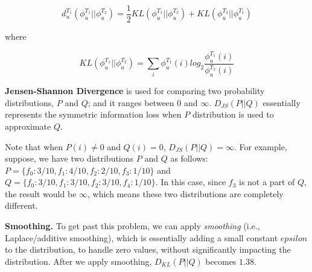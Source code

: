 \begin{equation}
d^{T_1}_u (\phi^{T_1}_u || \phi^{T_2}_u) = \frac{1}{2} KL(\phi^{T_1}_u || \phi^{T_2}_u) + KL(\phi^{T_2}_u || \phi^{T_1}_u)
\end{equation}

where 

\begin{equation}
KL(\phi^{T_1}_u || \phi^{T_2}_u) = \sum_i \phi^{T_1}_u(i)  log_2 \frac{\phi^{T_1}_u(i)}{\phi^{T_2}_u(i)}
\end{equation}

\textbf{Jensen-Shannon Divergence} is used for comparing two probability distributions, $P$ and $Q$; and it ranges between 0 and $\infty$. $D_{JS}(P||Q)$ essentially represents the symmetric information loss when $P$ distribution is used to approximate $Q$.

Note that when $P(i) \neq 0$ and $Q(i) = 0$,  $D_{JS}(P||Q)=\infty$. For example, suppose, we have two distributions $P$ and $Q$ as follows: $P = \{ f_0: 3/10, f_1: 4/10, f_2: 2/10, f_3: 1/10 \}$ and $Q = \{ f_0: 3/10, f_1: 3/10, f_2: 3/10, f_4: 1/10 \}$. In this case, since $f_3$ is not a part of $Q$, the result would be $\infty$, which means these two distributions are completely different. 

\textbf{Smoothing.} To get past this problem, we can apply \textit{smoothing} (i.e., Laplace/additive smoothing), which is essentially adding a small constant $epsilon$ to the distribution, to handle zero values, without significantly impacting the distribution. After we apply smoothing, $D_{KL}(P||Q)$ becomes $1.38$.
